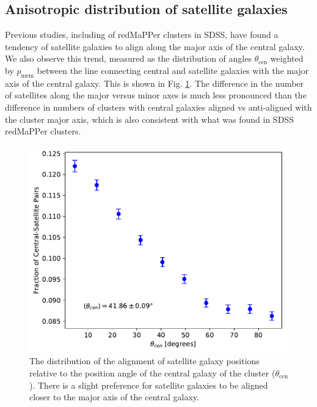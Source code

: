 \documentclass[fleqn,usenatbib]{mnras}
\begin{document}
\subsection{Anisotropic distribution of satellite galaxies}

Previous studies, including \cite{Huang_2016} of redMaPPer clusters in SDSS, have found a tendency of satellite galaxies to align along the major axis of the central galaxy. We also observe this trend, measured as the distribution of angles $\theta_{\mathrm{cen}}$ weighted by $p_{\mathrm{\mathrm{mem}}}$ between the line connecting central and satellite galaxies with the major axis of the central galaxy. This is shown in Fig. \ref{fig:thetacen}. The difference in the number of satellites along the major versus minor axes is much less pronounced than the difference in numbers of clusters with central galaxies aligned vs anti-aligned with the cluster major axis, which is also consistent with what was found in SDSS redMaPPer clusters.

\begin{figure}
\begin{center}
\includegraphics[width=\columnwidth]{theta_cen.pdf}
\end{center}
\caption[]{The distribution of the alignment of satellite galaxy positions relative to the position angle of the central galaxy of the cluster ($\theta_{\mathrm{cen}}$). There is a slight preference for satellite galaxies to be aligned closer to the major axis of the central galaxy.
\label{fig:thetacen}}
\end{figure}
\end{document}
